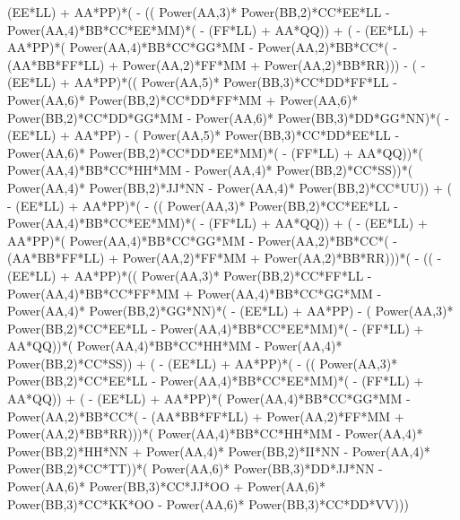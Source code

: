 \documentclass[10pt]{article} %
\begin{document}
{(EE*LL) + AA*PP)*( - (( Power(AA,3)* Power(BB,2)*CC*EE*LL -  Power(AA,4)*BB*CC*EE*MM)*( - (FF*LL) + AA*QQ)) + ( - (EE*LL) + AA*PP)*( Power(AA,4)*BB*CC*GG*MM -  Power(AA,2)*BB*CC*( - (AA*BB*FF*LL) +  Power(AA,2)*FF*MM +  Power(AA,2)*BB*RR))) - ( - (EE*LL) + AA*PP)*(( Power(AA,5)* Power(BB,3)*CC*DD*FF*LL -  Power(AA,6)* Power(BB,2)*CC*DD*FF*MM +  Power(AA,6)* Power(BB,2)*CC*DD*GG*MM -  Power(AA,6)* Power(BB,3)*DD*GG*NN)*( - (EE*LL) + AA*PP) - ( Power(AA,5)* Power(BB,3)*CC*DD*EE*LL -  Power(AA,6)* Power(BB,2)*CC*DD*EE*MM)*( - (FF*LL) + AA*QQ))*( Power(AA,4)*BB*CC*HH*MM -  Power(AA,4)* Power(BB,2)*CC*SS))*( Power(AA,4)* Power(BB,2)*JJ*NN -  Power(AA,4)* Power(BB,2)*CC*UU)) + ( - (EE*LL) + AA*PP)*( - (( Power(AA,3)* Power(BB,2)*CC*EE*LL -  Power(AA,4)*BB*CC*EE*MM)*( - (FF*LL) + AA*QQ)) + ( - (EE*LL) + AA*PP)*( Power(AA,4)*BB*CC*GG*MM -  Power(AA,2)*BB*CC*( - (AA*BB*FF*LL) +  Power(AA,2)*FF*MM +  Power(AA,2)*BB*RR)))*( - (( - (EE*LL) + AA*PP)*(( Power(AA,3)* Power(BB,2)*CC*FF*LL -  Power(AA,4)*BB*CC*FF*MM +  Power(AA,4)*BB*CC*GG*MM -  Power(AA,4)* Power(BB,2)*GG*NN)*( - (EE*LL) + AA*PP) - ( Power(AA,3)* Power(BB,2)*CC*EE*LL -  Power(AA,4)*BB*CC*EE*MM)*( - (FF*LL) + AA*QQ))*( Power(AA,4)*BB*CC*HH*MM -  Power(AA,4)* Power(BB,2)*CC*SS)) + ( - (EE*LL) + AA*PP)*( - (( Power(AA,3)* Power(BB,2)*CC*EE*LL -  Power(AA,4)*BB*CC*EE*MM)*( - (FF*LL) + AA*QQ)) + ( - (EE*LL) + AA*PP)*( Power(AA,4)*BB*CC*GG*MM -  Power(AA,2)*BB*CC*( - (AA*BB*FF*LL) +  Power(AA,2)*FF*MM +  Power(AA,2)*BB*RR)))*( Power(AA,4)*BB*CC*HH*MM -  Power(AA,4)* Power(BB,2)*HH*NN +  Power(AA,4)* Power(BB,2)*II*NN -  Power(AA,4)* Power(BB,2)*CC*TT))*( Power(AA,6)* Power(BB,3)*DD*JJ*NN -  Power(AA,6)* Power(BB,3)*CC*JJ*OO +  Power(AA,6)* Power(BB,3)*CC*KK*OO -  Power(AA,6)* Power(BB,3)*CC*DD*VV)))
}\break
\end{document}
